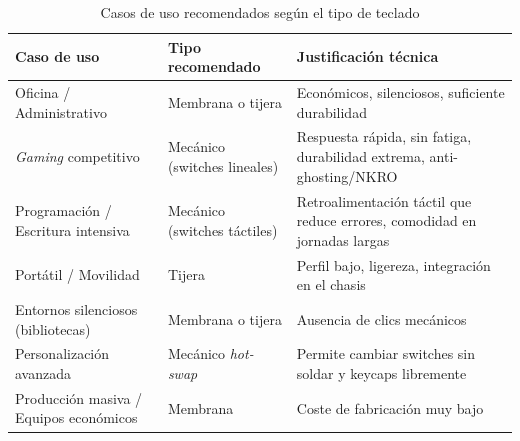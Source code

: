 \documentclass[12pt, letterpaper]{article}
\begin{document}
\begin{table}[h!]
\centering
\small
\begin{tabular}{>{\raggedright\arraybackslash}p{3.8cm}>{\raggedright\arraybackslash}p{3.5cm}>{\raggedright\arraybackslash}p{5.5cm}}
\toprule
\textbf{Caso de uso} & \textbf{Tipo recomendado} & \textbf{Justificación técnica} \\
\midrule
Oficina / Administrativo & Membrana o tijera & Económicos, silenciosos, suficiente durabilidad \\
\textit{Gaming} competitivo & Mecánico (switches lineales) & Respuesta rápida, sin fatiga, durabilidad extrema, anti-ghosting/NKRO \\
Programación / Escritura intensiva & Mecánico (switches táctiles) & Retroalimentación táctil que reduce errores, comodidad en jornadas largas \\
Portátil / Movilidad & Tijera & Perfil bajo, ligereza, integración en el chasis \\
Entornos silenciosos (bibliotecas) & Membrana o tijera & Ausencia de clics mecánicos \\
Personalización avanzada & Mecánico \textit{hot-swap} & Permite cambiar switches sin soldar y keycaps libremente \\
Producción masiva / Equipos económicos & Membrana & Coste de fabricación muy bajo \\
\bottomrule
\end{tabular}
\caption{Casos de uso recomendados según el tipo de teclado}
\label{tab:usos}
\end{table}

\FloatBarrier
\end{document}
